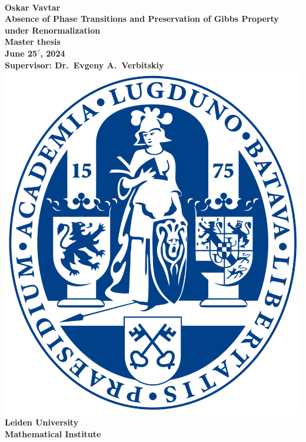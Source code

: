 \documentclass[12pt]{article}
\newcommand{\1}{\mathbbm{1}}
\newcommand{\5}{\vspace{0.5cm}}
\theoremstyle{definition}
\begin{document}
\begin{center}
~\\
\vspace{2cm}
\Large{\textbf{Oskar Vavtar}} \\
\vspace{2cm}
\LARGE{\textbf{Absence of Phase Transitions and Preservation of Gibbs Property under Renormalization}} \\
\vspace{3cm}
\large{\textbf{Master thesis\\\vspace{0.2cm} June 25$^?$, 2024}}
\vspace{3cm}\\
\large{\textbf{Supervisor: Dr.~Evgeny A.~Verbitskiy}} \\
\vspace{2cm}
\includegraphics[scale=0.07]{leiden_logo}\\
\large{\textbf{Leiden University\\
Mathematical Institute}}
\end{center}
\pagebreak

\end{document}
